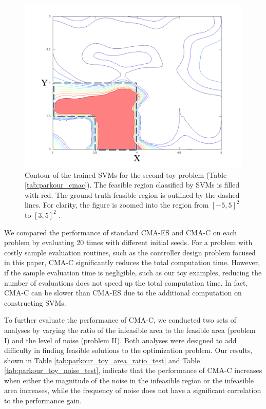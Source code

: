 \begin{figure}[tb]
\center
  \includegraphics[width=0.75\linewidth]{images/toy2svm}
  \caption{
    Contour of the trained SVMs for the second toy problem (Table \ref{tab:parkour_cmac}).
    The feasible region classified by SVMs is filled with red. The
    ground truth feasible region is outlined by the dashed lines.
    For clarity, the figure is zoomed into the region from $[-5,5]^2$ to $[3, 5]^2$ .
  }
  \label{fig:parkour_cmac}
\end{figure}

We compared the performance of standard CMA-ES and CMA-C on each
problem by evaluating 20 times with different initial seeds.
For a problem with costly sample
evaluation routines, such as the controller design problem focused in
this paper, CMA-C significantly reduces the total computation
time. However, if the sample evaluation time is negligible, such as
our toy examples, reducing the number of evaluations does not speed
up the total computation time. In fact, CMA-C can be slower than
CMA-ES due to the additional computation on constructing SVMs.

To further evaluate the performance of CMA-C, we conducted two sets of
analyses by varying the ratio of the infeasible area to the feasible
area (problem I) and the level of noise (problem II).  Both analyses
were designed to add difficulty in finding feasible solutions to the
optimization problem. Our results, shown in Table
\ref{tab:parkour_toy_area_ratio_test} and Table \ref{tab:parkour_toy_noise_test},
indicate that the performance of CMA-C increases when either the
magnitude of the noise in the infeasible region or the infeasible area increases,
while the frequency of noise does not have
a significant correlation to the performance gain.

